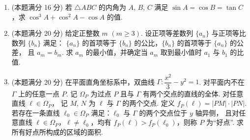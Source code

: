 \documentclass{chsmc}
\begin{document}
\begin{enumerate}[resume]
  \item (本题满分 16 分) 若 $\triangle ABC$ 的内角为 $A$, $B$, $C$ 满足
    $\sin A = \cos B = \tan C$，求 $\cos^3 A + \cos^2 A - \cos A$ 的值.
  \item (本题满分 20 分) 给定正整数 $m$ $(m \geqslant 3)$.
    设正项等差数列 $\{a_n\}$ 与正项等比数列 $\{b_n\}$ 满足：
    $\{a_n\}$ 的首项等于 $\{b_n\}$ 的公比，$\{b_n\}$ 的首项等于 $\{a_n\}$ 的公差，
    且 $a_m = b_m$. 求 $a_m$ 的最小值，并确定当 $a_m$ 取到最小值时
    $a_1$ 与 $b_1$ 的比值.
  \item (本题满分 20 分) 在平面直角坐标系中，双曲线
    $\Gamma\colon \dfrac{x^2}{3} - y^2 = 1$.
    对平面内不在 $\Gamma$ 上的任意一点 $P$. 记 $\Omega_P$ 为过点 $P$ 且与 $\Gamma$
    有两个交点的直线的全体. 对任意直线 $\ell \in \Omega_P$，
    记 $M$, $N$ 为 $\ell$ 与 $\Gamma$ 的两个交点.
    定义 $f_P(\ell) = |PM|\cdot|PN|$. 若存在一条直线
    $\ell_0 \in \Omega_P$ 满足：$\ell_0$ 与 $\Gamma$ 的两个交点位于 $y$ 轴异侧，
    且对任意直线 $\ell \in \Omega_P$，$\ell \neq \ell_0$，均有
    $f_P(\ell) > f_P(\ell_0)$，则称 $P$ 为“好点”.
    求所有好点所构成的区域的面积.
\end{enumerate}
\end{document}
